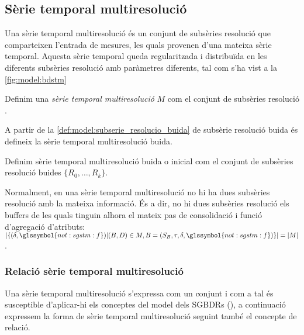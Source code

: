 \subsection{Sèrie temporal multiresolució}


Una sèrie temporal multiresolució és un conjunt de subsèries resolució
que comparteixen l'entrada de mesures, les quals provenen d'una
mateixa sèrie temporal. Aquesta sèrie temporal queda regularitzada i
distribuïda en les diferents subsèries resolució amb paràmetres
diferents, tal com s'ha vist a la \autoref{fig:model:bdstm}


\begin{definition}
  \label{def:sgstm:stm}
  Definim una \emph{sèrie temporal multiresolució} $M$ com el conjunt
  de subsèries resolució
  .
\end{definition}

A partir de la \autoref{def:model:subserie_resolucio_buida} de
subsèrie resolució buida és defineix la sèrie temporal multiresolució
buida.
 
\begin{definition}\label{def:model:st_multiresolucio_buit}
  Definim sèrie temporal multiresolució buida o inicial com el conjunt
  de subsèries resolució buides
  $\{R_{0},\dotsc,R_{k}\}$.
\end{definition}


Normalment, en una sèrie temporal multiresolució no hi ha dues
subsèries resolució amb la mateixa informació. És a dir, no hi dues
subsèries resolució els buffers de les quals tinguin alhora el mateix
pas de consolidació i funció d'agregació d'atributs:
$|\{(\delta,\glssymbol{not:sgstm:f})| (B,D)\in M,
B=(S_B,\tau,\delta,\glssymbol{not:sgstm:f})\}|=|M|$.



\subsubsection{Relació sèrie temporal multiresolució}

Una sèrie temporal multiresolució s'expressa com un conjunt i com a
tal és susceptible d'aplicar-hi els conceptes del model dels
\glspl{SGBDR} (), a continuació expressem la
forma de sèrie temporal multiresolució seguint també el concepte de
relació.


